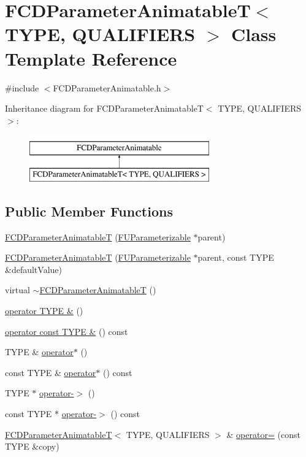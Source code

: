 \hypertarget{classFCDParameterAnimatableT}{
\section{FCDParameterAnimatableT$<$ TYPE, QUALIFIERS $>$ Class Template Reference}
\label{classFCDParameterAnimatableT}
}


{\ttfamily \#include $<$FCDParameterAnimatable.h$>$}

Inheritance diagram for FCDParameterAnimatableT$<$ TYPE, QUALIFIERS $>$:\begin{figure}[H]
\begin{center}
\leavevmode
\includegraphics[height=2.000000cm]{classFCDParameterAnimatableT}
\end{center}
\end{figure}
\subsection*{Public Member Functions}
\begin{DoxyCompactItemize}
\item 
\hyperlink{classFCDParameterAnimatableT_a331f65027ec251576b820c33b92d3f22}{FCDParameterAnimatableT} (\hyperlink{classFUParameterizable}{FUParameterizable} $\ast$parent)
\item 
\hyperlink{classFCDParameterAnimatableT_a7ff2e34cd4d7c527837ad0dd45f3d326}{FCDParameterAnimatableT} (\hyperlink{classFUParameterizable}{FUParameterizable} $\ast$parent, const TYPE \&defaultValue)
\item 
virtual \hyperlink{classFCDParameterAnimatableT_ad33600c14d5facb49b2b7fe4e9a393f4}{$\sim$FCDParameterAnimatableT} ()
\item 
\hyperlink{classFCDParameterAnimatableT_a95c08d92be4e579fec56ecee76c9a124}{operator TYPE \&} ()
\item 
\hyperlink{classFCDParameterAnimatableT_a9903fc763b607061df2ea9629967bc37}{operator const TYPE \&} () const 
\item 
TYPE \& \hyperlink{classFCDParameterAnimatableT_a803f16c183446b4069d67c221a1cb061}{operator$\ast$} ()
\item 
const TYPE \& \hyperlink{classFCDParameterAnimatableT_a281100d3dbde949cd4ca7e239a3515b0}{operator$\ast$} () const 
\item 
TYPE $\ast$ \hyperlink{classFCDParameterAnimatableT_a86e0d446010e5b648399ebbb1043340e}{operator-\/$>$} ()
\item 
const TYPE $\ast$ \hyperlink{classFCDParameterAnimatableT_a7dec8fd03b31964bfb2688f05e694bf6}{operator-\/$>$} () const 
\item 
\hyperlink{classFCDParameterAnimatableT}{FCDParameterAnimatableT}$<$ TYPE, QUALIFIERS $>$ \& \hyperlink{classFCDParameterAnimatableT_a69989c687eba331bc1da00e07218bc14}{operator=} (const TYPE \&copy)
\end{DoxyCompactItemize}

